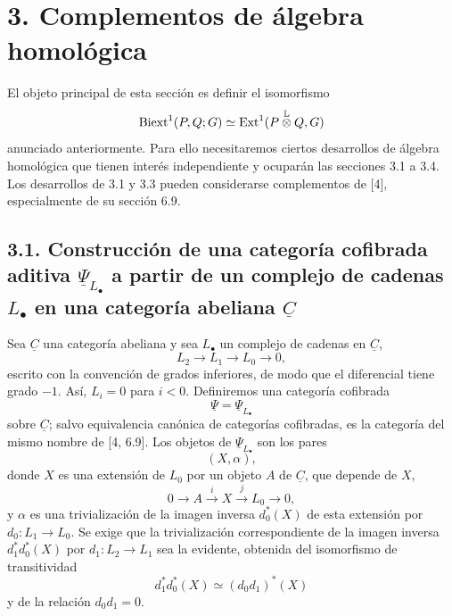 \section*{3. Complementos de álgebra homológica}

El objeto principal de esta sección es definir el isomorfismo
\[
 \operatorname{Biext}^1(P,Q;G)\simeq
 \operatorname{Ext}^1(P\overset{\mathbb L}{\otimes}Q,G)
\]
anunciado anteriormente. Para ello necesitaremos ciertos desarrollos
de álgebra homológica que tienen interés independiente y ocuparán las
secciones 3.1 a 3.4. Los desarrollos de 3.1 y 3.3 pueden considerarse
complementos de [4], especialmente de su sección 6.9.

\subsection*{3.1. Construcción de una categoría cofibrada aditiva
$\underline\Psi_{L_\bullet}$ a partir de un complejo de cadenas
$L_\bullet$ en una categoría abeliana $\underline C$}

Sea $\underline C$ una categoría abeliana y sea $L_\bullet$ un
complejo de cadenas en $\underline C$,
\begin{equation}\tag{3.1.1}
 L_2\longrightarrow L_1\longrightarrow L_0\longrightarrow0,
\end{equation}
escrito con la convención de grados inferiores, de modo que el
diferencial tiene grado $-1$. Así, $L_i=0$ para $i<0$. Definiremos una
categoría cofibrada
\[
 \underline\Psi=\underline\Psi_{L_\bullet}
\]
sobre $\underline C$; salvo equivalencia canónica de categorías
cofibradas, es la categoría del mismo nombre de [4, 6.9]. Los objetos
de $\underline\Psi_{L_\bullet}$ son los pares
\[
 (X,\alpha),
\]
donde $X$ es una extensión de $L_0$ por un objeto $A$ de
$\underline C$, que depende de $X$,
\begin{equation}\tag{3.1.2}
 0\longrightarrow A\xrightarrow{i}X\xrightarrow{j}L_0
 \longrightarrow0,
\end{equation}
y $\alpha$ es una trivialización de la imagen inversa $d_0^*(X)$ de
esta extensión por $d_0:L_1\longrightarrow L_0$. Se exige que la
trivialización correspondiente de la imagen inversa
$d_1^*d_0^*(X)$ por $d_1:L_2\longrightarrow L_1$ sea la evidente,
obtenida del isomorfismo de transitividad
\[
 d_1^*d_0^*(X)\simeq(d_0d_1)^*(X)
\]
y de la relación $d_0d_1=0$.

